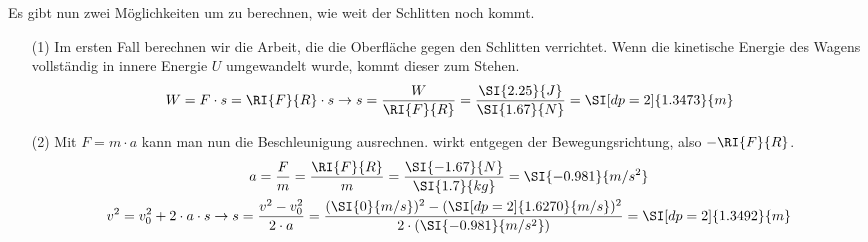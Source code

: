 \begin{aufgabe}
\begin{loesung}
\begin{itemize}
	Es gibt nun zwei Möglichkeiten um zu berechnen, wie weit der Schlitten noch kommt.
	\begin{itemize}
		\item [(1)] Im ersten Fall berechnen wir die Arbeit, die die Oberfläche gegen den Schlitten verrichtet.
			Wenn die kinetische Energie des Wagens vollständig in innere Energie $U$ umgewandelt wurde, kommt dieser zum Stehen.
			\begin{eqnarray*}
				W=F\cdot s =\RI{F}{R}\cdot s \to s =\frac{W}{\RI{F}{R}}=\frac{\SI{2.25}{J}}{\SI{1.67}{N}}=\SI[dp=2]{1.3473}{m}
			\end{eqnarray*}
		\item[(2)]			
				Mit $F=m\cdot a$ kann man nun die Beschleunigung ausrechnen.  wirkt entgegen der Bewegungsrichtung, also $-\RI{F}{R}$.
\begin{gather*}
	a=\frac{F}{m} =\frac{\RI{F}{R}}{m}=\frac{\SI{-1.67}{N}}{\SI{1.7}{kg}}=\SI{-0.981}{m/s^2}\\
	v^2=v_0^2+2\cdot a\cdot s \to s=\frac{v^2-v_0^2}{2\cdot a}=\frac{(\SI{0}{m/s})^2-(\SI[dp=2]{1.6270}{m/s})^2}{2\cdot(\SI{-0.981}{m/s^2})}=\SI[dp=2]{1.3492}{m}
\end{gather*}

	\end{itemize}
		\end{itemize}
	\end{loesung}

\end{aufgabe}
